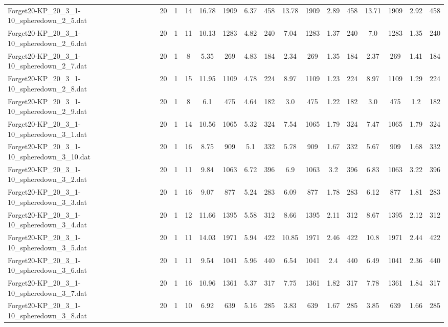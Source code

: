 \begin{sidewaystable}[!ht]
{\begin{tabular}{lccccccccccccccc}
Forget20-KP\_20\_3\_1-10\_spheredown\_2\_5.dat & 20 & 1 & 14 & 16.78 & 1909 & 6.37 & 458 & 13.78 & 1909 & 2.89 & 458 & 13.71 & 1909 & 2.92 & 458 \\
Forget20-KP\_20\_3\_1-10\_spheredown\_2\_6.dat & 20 & 1 & 11 & 10.13 & 1283 & 4.82 & 240 & 7.04 & 1283 & 1.37 & 240 & 7.0 & 1283 &  \textcolor{blue2}{1.35} & 240 \\
Forget20-KP\_20\_3\_1-10\_spheredown\_2\_7.dat & 20 & 1 & 8 & 5.35 & 269 & 4.83 & 184 & 2.34 & 269 & 1.35 & 184 & 2.37 & 269 & 1.41 & 184 \\
Forget20-KP\_20\_3\_1-10\_spheredown\_2\_8.dat & 20 & 1 & 15 & 11.95 & 1109 & 4.78 & 224 & 8.97 & 1109 &  \textcolor{blue2}{1.23} & 224 & 8.97 & 1109 & 1.29 & 224 \\
Forget20-KP\_20\_3\_1-10\_spheredown\_2\_9.dat & 20 & 1 & 8 & 6.1 & 475 & 4.64 & 182 & 3.0 & 475 & 1.22 & 182 & 3.0 & 475 & 1.2 & 182 \\
Forget20-KP\_20\_3\_1-10\_spheredown\_3\_1.dat & 20 & 1 & 14 & 10.56 & 1065 & 5.32 & 324 & 7.54 & 1065 & 1.79 & 324 & 7.47 & 1065 & 1.79 & 324 \\
Forget20-KP\_20\_3\_1-10\_spheredown\_3\_10.dat & 20 & 1 & 16 & 8.75 & 909 & 5.1 & 332 & 5.78 & 909 & 1.67 & 332 & 5.67 & 909 & 1.68 & 332 \\
Forget20-KP\_20\_3\_1-10\_spheredown\_3\_2.dat & 20 & 1 & 11 & 9.84 & 1063 & 6.72 & 396 & 6.9 & 1063 & 3.2 & 396 & 6.83 & 1063 & 3.22 & 396 \\
Forget20-KP\_20\_3\_1-10\_spheredown\_3\_3.dat & 20 & 1 & 16 & 9.07 & 877 & 5.24 & 283 & 6.09 & 877 & 1.78 & 283 & 6.12 & 877 & 1.81 & 283 \\
Forget20-KP\_20\_3\_1-10\_spheredown\_3\_4.dat & 20 & 1 & 12 & 11.66 & 1395 & 5.58 & 312 & 8.66 & 1395 & 2.11 & 312 & 8.67 & 1395 & 2.12 & 312 \\
Forget20-KP\_20\_3\_1-10\_spheredown\_3\_5.dat & 20 & 1 & 11 & 14.03 & 1971 & 5.94 & 422 & 10.85 & 1971 & 2.46 & 422 & 10.8 & 1971 & 2.44 & 422 \\
Forget20-KP\_20\_3\_1-10\_spheredown\_3\_6.dat & 20 & 1 & 11 & 9.54 & 1041 & 5.96 & 440 & 6.54 & 1041 & 2.4 & 440 & 6.49 & 1041 & 2.36 & 440 \\
Forget20-KP\_20\_3\_1-10\_spheredown\_3\_7.dat & 20 & 1 & 16 & 10.96 & 1361 & 5.37 & 317 & 7.75 & 1361 & 1.82 & 317 & 7.78 & 1361 & 1.84 & 317 \\
Forget20-KP\_20\_3\_1-10\_spheredown\_3\_8.dat & 20 & 1 & 10 & 6.92 & 639 & 5.16 & 285 & 3.83 & 639 & 1.67 & 285 & 3.85 & 639 & 1.66 & 285 \\

\end{tabular}}
\end{sidewaystable}
